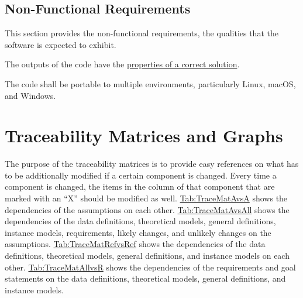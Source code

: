 \documentclass[12pt]{article}
\begin{document}
\subsection{Non-Functional Requirements}
\label{Sec:NFRs}
This section provides the non-functional requirements, the qualities that the software is expected to exhibit.

\begin{description}[font=\normalfont]
\item[Correctness:\phantomsection\label{correct}]{The outputs of the code have the \hyperref[Sec:CorSolProps]{properties of a correct solution}.}
\item[Portability:\phantomsection\label{portable}]{The code shall be portable to multiple environments, particularly Linux, macOS, and Windows.}
\end{description}
\section{Traceability Matrices and Graphs}
\label{Sec:TraceMatrices}
The purpose of the traceability matrices is to provide easy references on what has to be additionally modified if a certain component is changed. Every time a component is changed, the items in the column of that component that are marked with an ``X'' should be modified as well. \hyperref[Table:TraceMatAvsA]{Tab:TraceMatAvsA} shows the dependencies of the assumptions on each other. \hyperref[Table:TraceMatAvsAll]{Tab:TraceMatAvsAll} shows the dependencies of the data definitions, theoretical models, general definitions, instance models, requirements, likely changes, and unlikely changes on the assumptions. \hyperref[Table:TraceMatRefvsRef]{Tab:TraceMatRefvsRef} shows the dependencies of the data definitions, theoretical models, general definitions, and instance models on each other. \hyperref[Table:TraceMatAllvsR]{Tab:TraceMatAllvsR} shows the dependencies of the requirements and goal statements on the data definitions, theoretical models, general definitions, and instance models.
\end{document}
